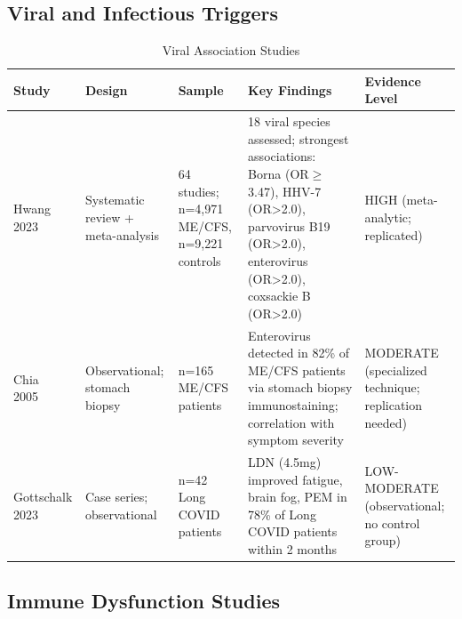 \subsection{Viral and Infectious Triggers}
\label{subsec:viral-trigger-studies}

\begin{table}[htbp]
\centering
\caption{Viral Association Studies}
\label{tab:viral-studies}
\scriptsize
\begin{tabular}{p{2cm}p{1.8cm}p{2.5cm}p{4cm}p{2cm}}
\toprule
\textbf{Study} & \textbf{Design} & \textbf{Sample} & \textbf{Key Findings} & \textbf{Evidence Level} \\
\midrule
Hwang 2023~\cite{hwang2023viral} & Systematic review + meta-analysis & 64 studies; n=4,971 ME/CFS, n=9,221 controls & 18 viral species assessed; strongest associations: Borna (OR$\geq$3.47), HHV-7 (OR>2.0), parvovirus B19 (OR>2.0), enterovirus (OR>2.0), coxsackie B (OR>2.0) & HIGH (meta-analytic; replicated) \\
\midrule
Chia 2005~\cite{Chia2005} & Observational; stomach biopsy & n=165 ME/CFS patients & Enterovirus detected in 82\% of ME/CFS patients via stomach biopsy immunostaining; correlation with symptom severity & MODERATE (specialized technique; replication needed) \\
\midrule
Gottschalk 2023~\cite{Gottschalk2023} & Case series; observational & n=42 Long COVID patients & LDN (4.5mg) improved fatigue, brain fog, PEM in 78\% of Long COVID patients within 2 months & LOW-MODERATE (observational; no control group) \\
\bottomrule
\end{tabular}
\end{table}

\subsection{Immune Dysfunction Studies}
\label{subsec:immune-studies}

